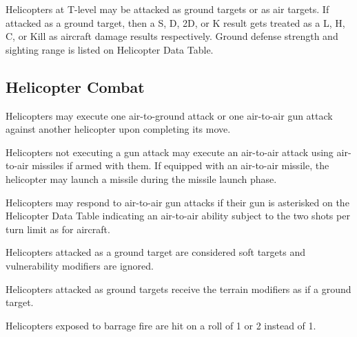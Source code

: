 {    Helicopters at T-level may be attacked as ground targets or as air targets.  If attacked as a ground target, then a S, D, 2D, or K result gets treated as a L, H, C, or Kill as aircraft damage results respectively.  Ground defense strength and sighting range is listed on Helicopter Data Table.

    \subsection{Helicopter Combat}

    Helicopters may execute one air-to-ground attack or one air-to-air gun attack against another helicopter upon completing its move.

    Helicopters not executing a gun attack may execute an air-to-air attack using air-to-air missiles if armed with them.  If equipped with an air-to-air missile, the helicopter may launch a missile during the missile launch phase.

    Helicopters may respond to air-to-air gun attacks if their gun is asterisked on the Helicopter Data Table indicating an air-to-air ability subject to the two shots per turn limit as for aircraft.

    Helicopters attacked as a ground target are considered soft targets and vulnerability modifiers are ignored.

    Helicopters attacked as ground targets receive the terrain modifiers as if a ground target.

    Helicopters exposed to barrage fire are hit on a roll of 1 or 2 instead of 1.

    }
